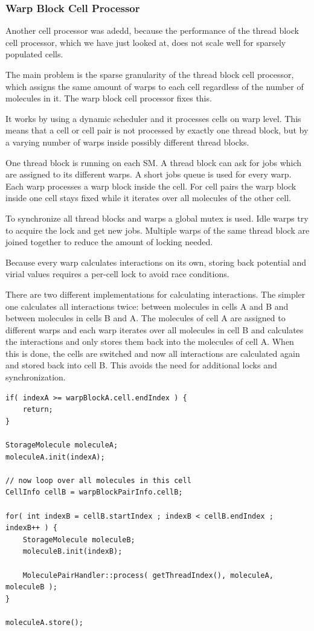 \subsubsection{Warp Block Cell Processor}
Another cell processor was adedd, because the performance of the thread block cell processor, which we have just looked at, does not scale well for sparsely populated cells. 

The main problem is the sparse granularity of the thread block cell processor, which assigns the same amount of warps to each cell regardless of the number of molecules in it. The warp block cell processor fixes this.

It works by using a dynamic scheduler and it processes cells on warp level. This means that a cell or cell pair is not processed by exactly one thread block, but by a varying number of warps inside possibly different thread blocks.

One thread block is running on each SM. A thread block can ask for jobs which are assigned to its different warps. A short jobs queue is used for every warp. Each warp processes a warp block inside the cell. For cell pairs the warp block inside one cell stays fixed while it iterates over all molecules of the other cell.

To synchronize all thread blocks and warps a global mutex is used. Idle warps try to acquire the lock and get new jobs. Multiple warps of the same thread block are joined together to reduce the amount of locking needed.

Because every warp calculates interactions on its own, storing back potential and virial values requires a per-cell lock to avoid race conditions.

There are two different implementations for calculating interactions. The simpler one calculates all  interactions twice: between molecules in cells A and B and between molecules in cells B and A.
The molecules of cell A are assigned to different warps and each warp iterates over all molecules in cell B and calculates the interactions and only stores them back into the molecules of cell A.
When this is done, the cells are switched and now all interactions are calculated again and stored back into cell B.
This avoids the need for additional locks and synchronization.

\begin{lstlisting}[caption=inter-cell block processing (warp block cell processor)]
if( indexA >= warpBlockA.cell.endIndex ) {
	return;
}

StorageMolecule moleculeA;
moleculeA.init(indexA);

// now loop over all molecules in this cell
CellInfo cellB = warpBlockPairInfo.cellB;

for( int indexB = cellB.startIndex ; indexB < cellB.endIndex ; indexB++ ) {
	StorageMolecule moleculeB;
	moleculeB.init(indexB);

	MoleculePairHandler::process( getThreadIndex(), moleculeA, moleculeB );
}

moleculeA.store();
\end{lstlisting}

